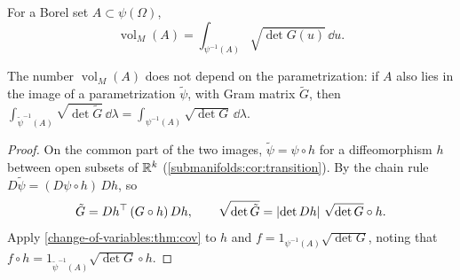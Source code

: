 \begin{notechapter}
\begin{definition}
\label{change-of-variables:def:volume}
For a Borel set $A\subset\psi(\Omega)$,
\[
  \operatorname{vol}_M(A)
  = \int_{\psi^{-1}(A)}\sqrt{\det G(u)}\,\dd u .
\]
\end{definition}

\begin{theorem}\label{change-of-variables:thm:independent}
The number $\operatorname{vol}_M(A)$ does not depend on the
parametrization: if $A$ also lies in the image of a parametrization
$\tilde\psi$, with Gram matrix $\tilde G$, then
$\int_{\tilde\psi^{-1}(A)}\sqrt{\det\tilde G}\,\dd\lambda
= \int_{\psi^{-1}(A)}\sqrt{\det G}\,\dd\lambda$.
\end{theorem}

\begin{proof}
On the common part of the two images, $\tilde\psi = \psi\circ h$ for a
diffeomorphism $h$ between open subsets of $\mathbb{R}^k$
(\cref{submanifolds:cor:transition}). By the chain rule
$D\tilde\psi = (D\psi\circ h)\,Dh$, so
\[
  \tilde G = Dh^\top\,(G\circ h)\,Dh , \qquad
  \sqrt{\det\tilde G} = \left|\det Dh\right|\,\sqrt{\det G}\circ h .
\]
Apply \cref{change-of-variables:thm:cov} to $h$ and
$f = 1_{\psi^{-1}(A)}\sqrt{\det G}$, noting that
$f\circ h = 1_{\tilde\psi^{-1}(A)}\sqrt{\det G}\circ h$.
\end{proof}


\end{notechapter}
